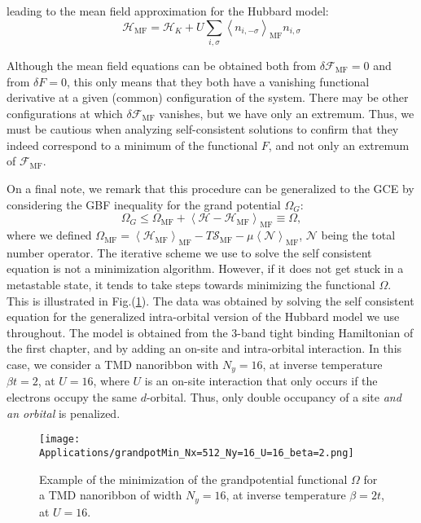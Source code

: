 leading to the mean field approximation for the Hubbard model:
\begin{equation}
\mathcal{H}_{\text{MF}} = \mathcal{H}_K + U \sum_{i, \sigma} \left\langle n_{i,- \sigma} \right\rangle_{\text{MF}} n_{i, \sigma}
\end{equation}

Although the mean field equations can be obtained both from $\delta \mathcal{F}_{\text{MF}} = 0$ and from $\delta F = 0$, this only means that they both have a vanishing functional derivative at a given (common) configuration of the system.
There may be other configurations at which $\delta \mathcal{F}_{\text{MF}}$ vanishes, but we have only an extremum.
Thus, we must be cautious when analyzing self-consistent solutions to confirm that they indeed correspond to a minimum of the functional $F$, and not only an extremum of $\mathcal{F}_{\text{MF}}$.

On a final note, we remark that this procedure can be generalized to the \ac{GCE} by considering the GBF inequality for the grand potential $\Omega_G$:
\begin{equation}\label{eq:gibbsGrand}
\Omega_G \le \Omega_{\text{MF}} + \left\langle \mathcal{H} - \mathcal{H}_{\text{MF}} \right\rangle_{\text{MF}} \equiv \Omega ,
\end{equation}
where we defined $\Omega_{\text{MF}} = \left\langle \mathcal{H}_{\text{MF}} \right\rangle_{\text{MF}} - T \mathcal{S}_{\text{MF}}- \mu \left\langle \mathcal{N} \right\rangle_{\text{MF}}$, $\mathcal{N}$ being the total number operator.
The iterative scheme we use to solve the self consistent equation is not a minimization algorithm.
However, if it does not get stuck in a metastable state, it tends to take steps towards minimizing the functional $\Omega$.
This is illustrated in Fig.(\ref{fig:grandPotMin}).
The data was obtained by solving the self consistent equation for the generalized intra-orbital version of the Hubbard model we use throughout.
The model is obtained from the 3-band tight binding Hamiltonian of the first chapter, and by adding an on-site and intra-orbital interaction.
In this case, we consider a \acs{TMD} nanoribbon with $N_y = 16$, at inverse temperature $\beta t = 2 $, at $U = 16$, where $U$ is an on-site interaction that only occurs if the electrons occupy the same $d$-orbital.
Thus, only double occupancy of a site \emph{and an orbital} is penalized.

\begin{figure}[H]
\centering
\texttt{[image: Applications/grandpotMin\_Nx=512\_Ny=16\_U=16\_beta=2.png]}
	\caption[Example of the minimization of the grandpotential functional.]{Example of the minimization of the grandpotential functional $\Omega$ for a TMD nanoribbon of width $N_y = 16$, at inverse temperature $\beta = 2 t $, at $U = 16$. \label{fig:grandPotMin}}
\end{figure}